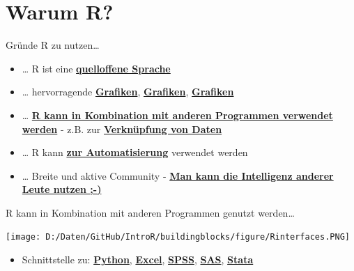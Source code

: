 \documentclass[ignorenonframetext,]{beamer}
\providecommand{\tightlist}{%
  \setlength{\itemsep}{0pt}\setlength{\parskip}{0pt}}
\begin{document}
\section{Warum R?}\label{warum-r}

\begin{frame}{Gründe R zu nutzen\ldots{}}

\begin{itemize}
\item
  \ldots{} R ist eine
  \href{https://stackoverflow.com/questions/1546583/what-is-the-definition-of-an-open-source-programming-language}{\textbf{quelloffene
  Sprache}}
\item
  \ldots{} hervorragende
  \href{http://matthewlincoln.net/2014/12/20/adjacency-matrix-plots-with-r-and-ggplot2.html}{\textbf{Grafiken}},
  \href{https://www.r-bloggers.com/3d-plots-with-ggplot2-and-plotly\%20/}{\textbf{Grafiken}},
  \href{https://procomun.wordpress.com/2011/03/18/splomr/}{\textbf{Grafiken}}
\item
  \ldots{} \href{https://github.com/Japhilko/RInterfaces}{\textbf{R kann
  in Kombination mit anderen Programmen verwendet werden}} - z.B. zur
  \href{https://github.com/Japhilko/RInterfaces/blob/master/slides/Datenimport.md}{\textbf{Verknüpfung
  von Daten}}
\item
  \ldots{} R kann
  \href{https://cran.r-project.org/web/packages/MplusAutomation/index.html}{\textbf{zur
  Automatisierung}} verwendet werden
\item
  \ldots{} Breite und aktive Community -
  \href{https://www.r-bloggers.com/}{\textbf{Man kann die Intelligenz
  anderer Leute nutzen ;-)}}
\end{itemize}

\end{frame}

\begin{frame}{R kann in Kombination mit anderen Programmen genutzt
werden\ldots{}}

\texttt{[image: D:/Daten/GitHub/IntroR/buildingblocks/figure/Rinterfaces.PNG]}

\begin{itemize}
\tightlist
\item
  Schnittstelle zu:
  \href{https://cran.r-project.org/web/packages/reticulate/vignettes/calling_python.html}{\textbf{Python}},
  \href{https://www.springer.com/de/book/9781441900517}{\textbf{Excel}},
  \href{https://www.ibm.com/support/knowledgecenter/en/SSFUEU_7.2.0/com.ibm.swg.ba.cognos.op_capmod_ig.7.2.0.doc/t_essentials_for_r_statistics.html}{\textbf{SPSS}},
  \href{https://cran.r-project.org/web/packages/SASmixed/index.html}{\textbf{SAS}},
  \href{https://cran.r-project.org/web/packages/RStata/index.html}{\textbf{Stata}}
\end{itemize}

\end{frame}
\end{document}
